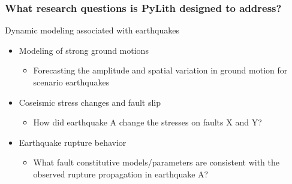 \documentclass[aspectratio=169]{beamer}
\begin{document}
\begin{frame}
  \frametitle{What research questions is PyLith designed to address?}

  \vfill
  Dynamic modeling associated with earthquakes
  \vfill

  \begin{itemize}
  \item Modeling of strong ground motions
    \begin{itemize}
    \item Forecasting the amplitude and spatial variation in ground
      motion for scenario earthquakes
    \end{itemize}
  \item Coseismic stress changes and fault slip
    \begin{itemize}
    \item How did earthquake A change the stresses on faults X and Y?
    \end{itemize}
  \item Earthquake rupture behavior
    \begin{itemize}
    \item What fault constitutive models/parameters are consistent
      with the observed rupture propagation in earthquake A?
    \end{itemize}
  \end{itemize}
  \vfill

\end{frame}
\end{document}
